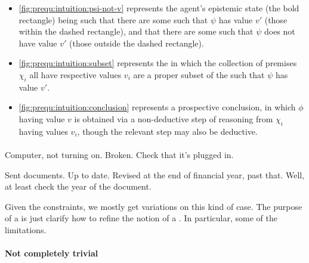 \begin{note}
  \begin{itemize}
  \item
    \autoref{fig:prequ:intuition:psi-not-v} represents the agent's epistemic state (the bold rectangle) being such that there are some  such that \(\psi\) has value \(v'\) (those within the dashed rectangle), and that there are some  such that \(\psi\) does not have value \(v'\) (those outside the dashed rectangle).
  \item
    \autoref{fig:prequ:intuition:subset} represents the  in which the collection of premises \(\chi_{i}\) all have respective values \(v_{i}\) are a proper subset of the  such that \(\psi\) has value \(v'\).
  \item
    \autoref{fig:prequ:intuition:conclusion} represents a prospective conclusion, in which \(\phi\) having value \(v\) is obtained via a non-deductive step of reasoning from \(\chi_{i}\) having values \(v_{i}\), though the relevant step may also be deductive.
  \end{itemize}
\end{note}

\paragraph{}

\begin{note}
  \begin{illustration}
    Computer, not turning on.
    Broken.
    Check that it's plugged in.
  \end{illustration}
\end{note}

\begin{note}
  \begin{illustration}
    Sent documents.
    Up to date.
    Revised at the end of financial year, past that.
    Well, at least check the year of the document.
  \end{illustration}
\end{note}

\begin{note}
  Given the constraints, we mostly get variations on this kind of case.
  The purpose of a \prequ{} is just clarify how to refine the notion of a \requ{}.
  In particular, some of the limitations.
\end{note}

\paragraph{Not completely trivial}

